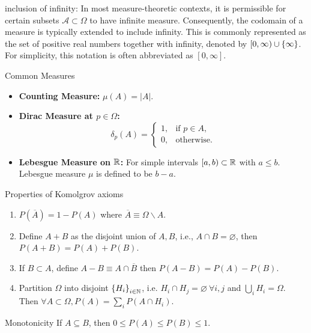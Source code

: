 \begin{rmk}{inclusion of infinity:}
In most measure-theoretic contexts, it is permissible for certain subsets  $\mathcal{A}\subset \Omega$ to have infinite measure. Consequently, the codomain of a measure is typically extended to include infinity. This is commonly represented as the set of positive real numbers together with infinity, denoted by $[0, \infty)\cup\qty{\infty}$. For simplicity, this notation is often abbreviated as $[0, \infty]$. 
\end{rmk}


\begin{eg}{Common Measures}
\begin{itemize}
    \item \textbf{Counting Measure:} \(\mu(A) = |A|\).
    \item \textbf{Dirac Measure at \(p \in \Omega\):}
    \[
    \delta_p(A) = 
    \begin{cases} 
    1, & \text{if } p \in A, \\
    0, & \text{otherwise}.
    \end{cases}
    \]
    \item \textbf{Lebesgue Measure on ${\mathbb{R}}$:} For simple intervals $[a, b)\subset {\mathbb{R}}$ with $a\leq b$. Lebesgue measure $\mu$ is defined to be $b-a$. 
\end{itemize}
\end{eg}

\begin{prop}{Properties of Komolgrov axioms}
\begin{enumerate}
	\item $P(\overline A) = 1-P(A)$ where $\overline A \equiv \Omega\backslash A$.
	\item Define $A+B$ as the disjoint union of $A, B$, i.e., $A\cap B = \varnothing$, then $P(A+B) = P(A) + P(B)$. 
	\item If $B\subset A$, define $A-B \equiv A\cap \overline B$  then $P(A-B) = P(A) - P(B)$. 
	\item Partition $\Omega$ into disjoint $\qty{H_i}_{i\in \mathbb{N}}$, i.e. $H_i\cap H_j = \varnothing \ \forall i, j$ and $\bigcup_i H_i = \Omega$. Then $\forall A\subset \Omega, P(A) = \sum_i P(A\cap H_i)$. 
\end{enumerate}
\end{prop}

\begin{cor}{Monotonicity}
If $A\subseteq B$, then $0\leq P(A) \leq P(B)\leq 1$. 	
\end{cor}\


